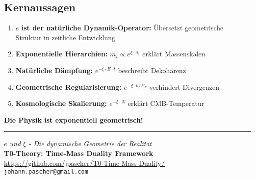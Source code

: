 \documentclass[12pt,a4paper]{article}
\begin{document}
	\subsection{Kernaussagen}
	
	\begin{enumerate}
		\item \textbf{$e$ ist der natürliche Dynamik-Operator:}
		Übersetzt geometrische Struktur in zeitliche Entwicklung
		
		\item \textbf{Exponentielle Hierarchien:} 
		$m_i \propto e^{\xi \cdot n_i}$ erklärt Massenskalen
		
		\item \textbf{Natürliche Dämpfung:}
		$e^{-\xi \cdot E \cdot t}$ beschreibt Dekohärenz
		
		\item \textbf{Geometrische Regularisierung:}
		$e^{-\xi \cdot k/E_P}$ verhindert Divergenzen
		
		\item \textbf{Kosmologische Skalierung:}
		$e^{-\xi \cdot N}$ erklärt CMB-Temperatur
	\end{enumerate}
	
	\begin{center}
		\vspace{0.5cm}
		\textbf{Die Physik ist exponentiell geometrisch!}
	\end{center}
	
	\vfill
	
	\begin{center}
		\hrule
		\vspace{0.5cm}
		\textit{$e$ und $\xi$ - Die dynamische Geometrie der Realität}\\[0.2cm]
		\textbf{T0-Theory: Time-Mass Duality Framework}\\
		\url{https://github.com/jpascher/T0-Time-Mass-Duality/}\\
		\texttt{johann.pascher@gmail.com}
		\vspace{0.3cm}
	\end{center}
	
	
\end{document}
